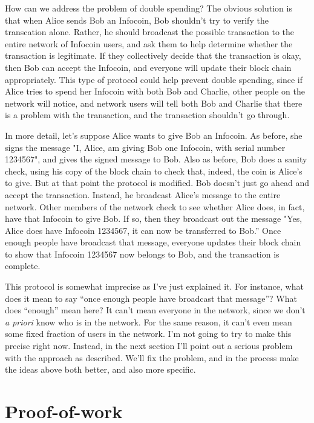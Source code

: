 \documentclass[12pt]{book}
\newcounter{problem}[chapter]
\begin{document}
How can we address the problem of double spending?  The obvious
solution is that when Alice sends Bob an Infocoin, Bob shouldn't try
to verify the transcation alone.  Rather, he should broadcast the
possible transaction to the entire network of Infocoin users, and ask
them to help determine whether the transaction is legitimate.  If they
collectively decide that the transaction is okay, then Bob can accept
the Infocoin, and everyone will update their block chain
appropriately.  This type of protocol could help prevent double
spending, since if Alice tries to spend her Infocoin with both Bob and
Charlie, other people on the network will notice, and network users
will tell both Bob and Charlie that there is a problem with the
transaction, and the transaction shouldn't go through.

In more detail, let's suppose Alice wants to give Bob an Infocoin.  As
before, she signs the message "I, Alice, am giving Bob one Infocoin,
with serial number 1234567", and gives the signed message to Bob.
Also as before, Bob does a sanity check, using his copy of the block
chain to check that, indeed, the coin is Alice's to give.  But at that
point the protocol is modified.  Bob doesn't just go ahead and accept
the transaction.  Instead, he broadcast Alice's message to the entire
network.  Other members of the network check to see whether Alice
does, in fact, have that Infocoin to give Bob.  If so, then they
broadcast out the message "Yes, Alice does have Infocoin 1234567, it
can now be transferred to Bob.''  Once enough people have broadcast
that message, everyone updates their block chain to show that Infocoin
1234567 now belongs to Bob, and the transaction is complete.

This protocol is somewhat imprecise as I've just explained it.  For
instance, what does it mean to say ``once enough people have broadcast
that message''?  What does ``enough'' mean here?  It can't mean
everyone in the network, since we don't \emph{a priori} know who is in
the network.  For the same reason, it can't even mean some fixed
fraction of users in the network.  I'm not going to try to make this
precise right now.  Instead, in the next section I'll point out a
serious problem with the approach as described.  We'll fix the
problem, and in the process make the ideas above both better, and also
more specific.

\section{Proof-of-work}
\end{document}
